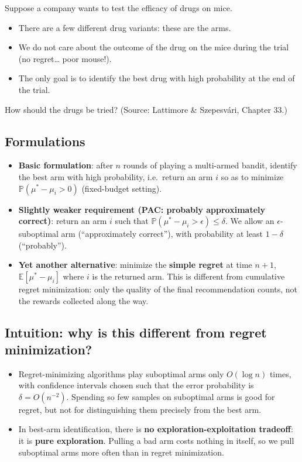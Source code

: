 Suppose a company wants to test the efficacy of drugs on mice.
\begin{itemize}
    \item There are a few different drug variants: these are the arms.
    \item We do not care about the outcome of the drug on the mice during the trial (no regret\dots{} poor mouse!).
    \item The only goal is to identify the best drug with high probability at the end of the trial.
\end{itemize}
How should the drugs be tried? (Source: Lattimore \& Szepesvári, Chapter 33.)

\subsection{Formulations}

\begin{itemize}
    \item \textbf{Basic formulation}: after $n$ rounds of playing a multi-armed bandit, identify the best arm with high probability, i.e.\ return an arm $i$ so as to minimize $\mathbb{P}(\mu^* - \mu_i > 0)$ (fixed-budget setting).
    \item \textbf{Slightly weaker requirement (PAC: probably approximately correct)}: return an arm $i$ such that $\mathbb{P}(\mu^* - \mu_i > \epsilon) \leq \delta$. We allow an $\epsilon$-suboptimal arm (``approximately correct''), with probability at least $1 - \delta$ (``probably'').
    \item \textbf{Yet another alternative}: minimize the \textbf{simple regret} at time $n+1$, $\mathbb{E}[\mu^* - \mu_i]$ where $i$ is the returned arm. This is different from cumulative regret minimization: only the quality of the final recommendation counts, not the rewards collected along the way.
\end{itemize}

\subsection{Intuition: why is this different from regret minimization?}

\begin{itemize}
    \item Regret-minimizing algorithms play suboptimal arms only $O(\log n)$ times, with confidence intervals chosen such that the error probability is $\delta = O(n^{-2})$. Spending so few samples on suboptimal arms is good for regret, but not for distinguishing them precisely from the best arm.
    \item In best-arm identification, there is \textbf{no exploration-exploitation tradeoff}: it is \textbf{pure exploration}. Pulling a bad arm costs nothing in itself, so we pull suboptimal arms more often than in regret minimization.
\end{itemize}

